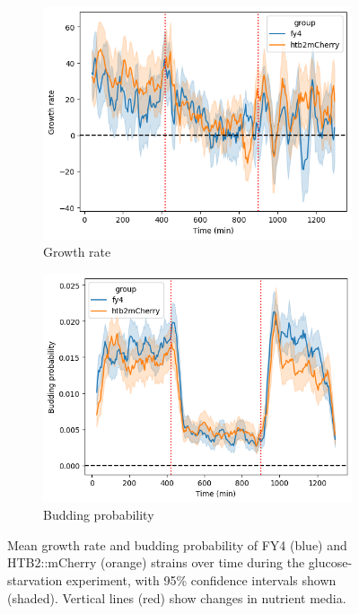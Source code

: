 \begin{figure}
  \centering
  \begin{subfigure}[htpb]{0.7\textwidth}
   \centering
   \includegraphics[width=\textwidth]{allstrains_19972_gr}
   \caption{
     Growth rate
   }
   \label{fig:biology-starvation-gr}
  \end{subfigure}

  \begin{subfigure}[htpb]{0.7\textwidth}
   \centering
   \includegraphics[width=\textwidth]{allstrains_19972_budprob}
   \caption{
     Budding probability
   }
   \label{fig:biology-starvation-budprob}
  \end{subfigure}

  \caption{
    Mean growth rate and budding probability of FY4 (blue) and HTB2::mCherry (orange) strains over time during the glucose-starvation experiment, with 95\% confidence intervals shown (shaded).
    Vertical lines (red) show changes in nutrient media.
  }
  \label{fig:biology-starvation-gr-budprob}
\end{figure}



